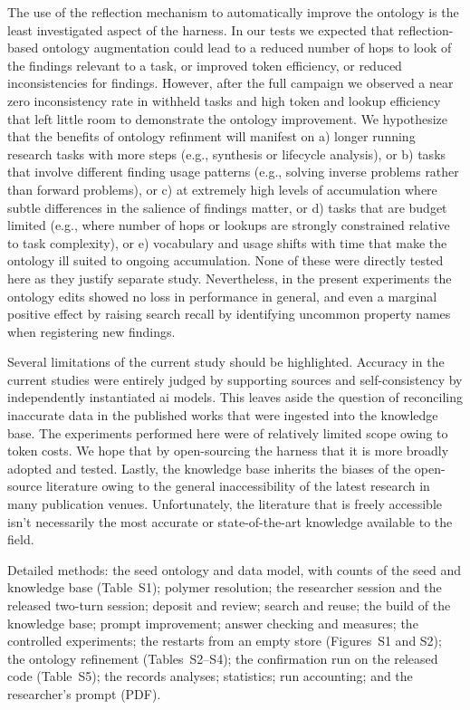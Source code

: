 \documentclass[journal=mamobx,manuscript=article]{achemso}
\newcommand{\tbd}[1]{\textcolor{red}{[#1]}}
\begin{document}
The use of the reflection mechanism to automatically improve the ontology is the least investigated aspect of the harness.
In our tests we expected that reflection-based ontology augmentation could lead to a reduced number of hops to look of the findings relevant to a task, or improved token efficiency, or reduced inconsistencies for findings.
However, after the full campaign we observed a near zero inconsistency rate in withheld tasks and high token and lookup efficiency that left little room to demonstrate the ontology improvement.
We hypothesize that the benefits of ontology refinment will manifest on a) longer running research tasks with more steps (e.g., synthesis or lifecycle analysis), or b) tasks that involve different finding usage patterns (e.g., solving inverse problems rather than forward problems), or c) at extremely high levels of accumulation where subtle differences in the salience of findings matter, or d) tasks that are budget limited (e.g., where number of hops or lookups are strongly constrained relative to task complexity), or e) vocabulary and usage shifts with time that make the ontology ill suited to ongoing accumulation.
None of these were directly tested here as they justify separate study.
Nevertheless, in the present experiments the ontology edits showed no loss in performance in general, and even a marginal positive effect by raising search recall by identifying uncommon property names when registering new findings.

Several limitations of the current study should be highlighted.
Accuracy in the current studies were entirely judged by supporting sources and self-consistency by independently instantiated ai models.
This leaves aside the question of reconciling inaccurate data in the published works that were ingested into the knowledge base.
The experiments performed here were of relatively limited scope owing to token costs.
We hope that by open-sourcing the harness that it is more broadly adopted and tested.
Lastly, the knowledge base inherits the biases of the open-source literature owing to the general inaccessibility of the latest research in many publication venues. Unfortunately, the literature that is freely accessible isn't necessarily the most accurate or state-of-the-art knowledge available to the field.

\begin{suppinfo}
Detailed methods: the seed ontology and data model, with counts of the seed and knowledge base (Table~S1); polymer resolution; the researcher session and the released two-turn session; deposit and review; search and reuse; the build of the knowledge base; prompt improvement; answer checking and measures; the controlled experiments; the restarts from an empty store (Figures~S1 and S2); the ontology refinement (Tables~S2--S4); the confirmation run on the released code (Table~S5); the records analyses; statistics; run accounting; and the researcher's prompt (PDF).
\end{suppinfo}
\end{document}
